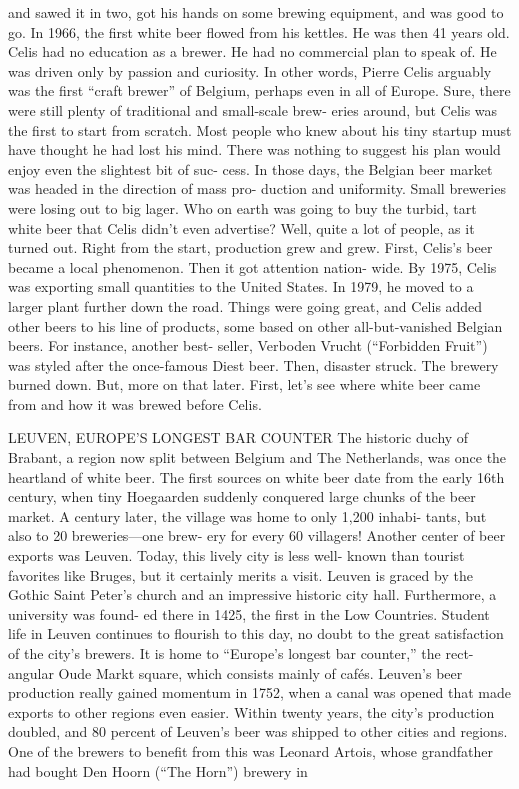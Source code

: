 \documentclass[a4paper,parskip=half]{scrartcl}
\begin{document}
\parencite[46]{Mulder2020}
and sawed it in two, got his hands on some
brewing equipment, and was good to go. In
1966, the first white beer flowed from his
kettles. He was then 41 years old.
Celis had no education as a brewer. He
had no commercial plan to speak of. He
was driven only by passion and curiosity.
In other words, Pierre Celis arguably was
the first “craft brewer” of Belgium, perhaps
even in all of Europe. Sure, there were still
plenty of traditional and small-scale brew-
eries around, but Celis was the first to start
from scratch. Most people who knew about
his tiny startup must have thought he had
lost his mind.
There was nothing to suggest his plan
would enjoy even the slightest bit of suc-
cess. In those days, the Belgian beer market
was headed in the direction of mass pro-
duction and uniformity. Small breweries
were losing out to big lager. Who on earth
was going to buy the turbid, tart white beer
that Celis didn’t even advertise?
Well, quite a lot of people, as it turned
out. Right from the start, production grew
and grew. First, Celis’s beer became a local
phenomenon. Then it got attention nation-
wide. By 1975, Celis was exporting small
quantities to the United States. In 1979, he
moved to a larger plant further down the
road. Things were going great, and Celis
added other beers to his line of products,
some based on other all-but-vanished
Belgian beers. For instance, another best-
seller, Verboden Vrucht (“Forbidden Fruit”)
was styled after the once-famous Diest beer.
Then, disaster struck. The brewery
burned down. But, more on that later.
First, let’s see where white beer came from
and how it was brewed before Celis.

LEUVEN, EUROPE’S LONGEST
BAR COUNTER
The historic duchy of Brabant, a region
now split between Belgium and The
Netherlands, was once the heartland of
white beer. The first sources on white beer
date from the early 16th century, when
tiny Hoegaarden suddenly conquered large
chunks of the beer market. A century later,
the village was home to only 1,200 inhabi-
tants, but also to 20 breweries—one brew-
ery for every 60 villagers!
Another center of beer exports was
Leuven. Today, this lively city is less well-
known than tourist favorites like Bruges,
but it certainly merits a visit. Leuven is
graced by the Gothic Saint Peter’s church
and an impressive historic city hall.
Furthermore, a university was found-
ed there in 1425, the first in the Low
Countries. Student life in Leuven continues
to flourish to this day, no doubt to the great
satisfaction of the city’s brewers. It is home
to “Europe’s longest bar counter,” the rect-
angular Oude Markt square, which consists
mainly of cafés.
Leuven’s beer production really gained
momentum in 1752, when a canal was
opened that made exports to other regions
even easier. Within twenty years, the city’s
production doubled, and 80 percent of
Leuven’s beer was shipped to other cities
and regions.
One of the brewers to benefit from this
was Leonard Artois, whose grandfather had
bought Den Hoorn (“The Horn”) brewery in
\end{document}
